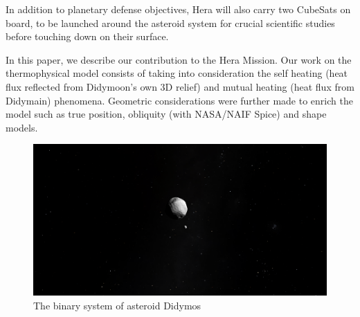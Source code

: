 In addition to planetary defense objectives, Hera will also carry two CubeSats on board, to be launched around the asteroid system for crucial scientific studies before touching down on their surface. 

In this paper, we describe our contribution to the Hera Mission. Our work on the thermophysical model consists of taking into consideration the self heating (heat flux reflected from Didymoon's own 3D relief) and mutual heating (heat flux from Didymain) phenomena. Geometric considerations were further made to enrich the model such as true position, obliquity (with NASA/NAIF Spice) and shape models.  

\begin{figure}[b]
    \centering
    \includegraphics[width=\linewidth]{rsc/didy.png}
    \caption{The binary system of asteroid Didymos}
    \label{fig:1.2}
\end{figure}
